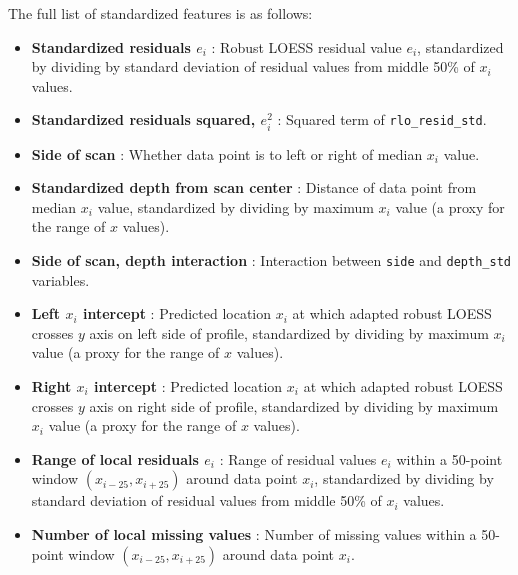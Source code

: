 \documentclass[12pt]{article}
\begin{document}
The full list of standardized features is as follows:

\begin{itemize}

\item[] \textbf{Standardized residuals $e_i$} {}: Robust LOESS residual value $e_i$, standardized by dividing by standard deviation of residual values from middle 50\% of $x_i$ values.  

\item[] \textbf{Standardized residuals squared, $e_i^2$} {}: Squared term of \texttt{rlo\_resid\_std}.   

\item[] \textbf{Side of scan} {}: Whether data point is to left or right of median $x_i$ value.  

\item[] \textbf{Standardized depth from scan center} {}: Distance of data point from median $x_i$ value, standardized by dividing by maximum $x_i$ value (a proxy for the range of $x$ values).  

\item[] \textbf{Side of scan, depth interaction} {}: Interaction between \texttt{side} and \texttt{depth\_std} variables.  

\item[] \textbf{Left $x_i$ intercept} {}: Predicted location $x_i$ at which adapted robust LOESS crosses $y$ axis on left side of profile, standardized by dividing by maximum $x_i$ value (a proxy for the range of $x$ values).  

\item[] \textbf{Right $x_i$ intercept} {}: Predicted location $x_i$ at which adapted robust LOESS crosses $y$ axis on right side of profile, standardized by dividing by maximum $x_i$ value (a proxy for the range of $x$ values).  

\item[] \textbf{Range of local residuals $e_i$} {}: Range of residual values $e_i$ within a 50-point window $(x_{i-25}, x_{i+25})$ around data point $x_i$, standardized by dividing by standard deviation of residual values from middle 50\% of $x_i$ values.  

\item[] \textbf{Number of local missing values} {}: Number of missing values within a 50-point window $(x_{i-25}, x_{i+25})$ around data point $x_i$.  


\end{itemize}
\end{document}
